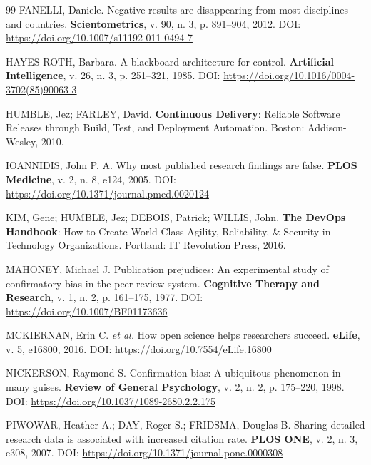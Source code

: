 \begin{thebibliography}{99}
FANELLI, Daniele.
Negative results are disappearing from most disciplines and countries.
\textbf{Scientometrics}, v. 90, n. 3, p. 891--904, 2012.
DOI: \url{https://doi.org/10.1007/s11192-011-0494-7}

HAYES-ROTH, Barbara.
A blackboard architecture for control.
\textbf{Artificial Intelligence}, v. 26, n. 3, p. 251--321, 1985.
DOI: \url{https://doi.org/10.1016/0004-3702(85)90063-3}

HUMBLE, Jez; FARLEY, David.
\textbf{Continuous Delivery}: Reliable Software Releases through
Build, Test, and Deployment Automation.
Boston: Addison-Wesley, 2010.

IOANNIDIS, John P. A.
Why most published research findings are false.
\textbf{PLOS Medicine}, v. 2, n. 8, e124, 2005.
DOI: \url{https://doi.org/10.1371/journal.pmed.0020124}

KIM, Gene; HUMBLE, Jez; DEBOIS, Patrick; WILLIS, John.
\textbf{The DevOps Handbook}: How to Create World-Class Agility,
Reliability, \& Security in Technology Organizations.
Portland: IT Revolution Press, 2016.

MAHONEY, Michael J.
Publication prejudices: An experimental study of confirmatory bias
in the peer review system.
\textbf{Cognitive Therapy and Research}, v. 1, n. 2, p. 161--175, 1977.
DOI: \url{https://doi.org/10.1007/BF01173636}

MCKIERNAN, Erin C. \textit{et al.}
How open science helps researchers succeed.
\textbf{eLife}, v. 5, e16800, 2016.
DOI: \url{https://doi.org/10.7554/eLife.16800}

NICKERSON, Raymond S.
Confirmation bias: A ubiquitous phenomenon in many guises.
\textbf{Review of General Psychology}, v. 2, n. 2, p. 175--220, 1998.
DOI: \url{https://doi.org/10.1037/1089-2680.2.2.175}

PIWOWAR, Heather A.; DAY, Roger S.; FRIDSMA, Douglas B.
Sharing detailed research data is associated with increased citation rate.
\textbf{PLOS ONE}, v. 2, n. 3, e308, 2007.
DOI: \url{https://doi.org/10.1371/journal.pone.0000308}


\end{thebibliography}
